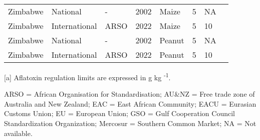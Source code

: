 \begin{landscape}
\begin{longtable}[c]{llllllll}
Zimbabwe          & National      & -        & 2002 & Maize  & 5  & NA & \citet{van2004worldwide}     \\
Zimbabwe          & International & ARSO     & 2022 & Maize  & 5  & 10 & \citet{ARSO2022}             \\
Zimbabwe          & National      & -        & 2002 & Peanut & 5  & NA & \citet{van2004worldwide}     \\
Zimbabwe          & International & ARSO     & 2022 & Peanut & 5  & 10 & \citet{ARSO2022}             \\ 
\hline
\end{longtable}
\begin{minipage}{1.5\textwidth}
\renewcommand{\footnoterule}
\textsuperscript{[a]} Aflatoxin regulation limits are expressed in \textmu g kg \textsuperscript{-1}. 


ARSO = African Organisation for Standardisation;
AU\&NZ = Free trade zone of Australia and New Zealand;
EAC = East African Community;
EACU = Eurasian Customs Union; 
EU = European Union;
GSO =  Gulf Cooperation Council Standardization Organization; 
Mercosur = Southern Common Market;
NA = Not available. \\ 
\end{minipage}
\endgroup
\end{landscape}
